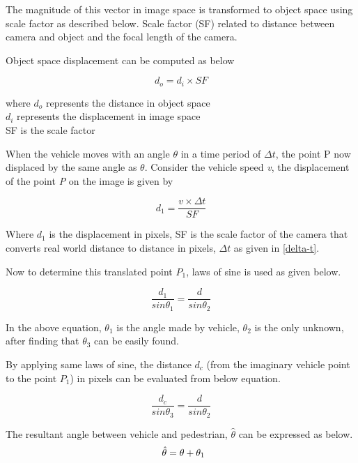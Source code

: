 The magnitude of this vector in image space is transformed to object space using scale factor as described below. Scale factor (SF) related to distance between camera and object and the focal length of the camera.

Object space displacement can be computed as below

\begin{equation} \label{conversion}
{d_o}= {d_i} \times SF
\end{equation} 

where $d_o$ represents the distance in object space \\
$d_i$ represents the displacement in image space \\
SF is the scale factor

When the vehicle moves with an angle ${\theta }$ in a time period of ${\Delta t}$, the point P now displaced by the same angle as ${\theta}$. Consider the vehicle speed \textit{v}, the displacement of the point \textit{P} on the image is given by

\begin{equation} \label{distance-in-pixel}
{d_1}= \frac{v \times \Delta t}{SF}
\end{equation} 

Where ${d_1}$ is the displacement in pixels, SF is the scale factor of the camera that converts real world distance to distance in pixels, $\Delta t$ as given in \ref{delta-t}.

Now to determine this translated point ${P_1}$, laws of sine is used as given below. 

\begin{equation}
\frac{d_1}{sin \theta_1} = \frac{d}{sin \theta_2} 
\end{equation}

In the above equation, $\theta_1$ is the angle made by vehicle, $\theta_2$ is the only unknown, after finding that $\theta_3$ can be easily found.

By applying same laws of sine, the distance $d_c$ (from the imaginary vehicle point to the point $P_1$) in pixels can be evaluated from below equation.

\begin{equation} \label{camera-distance}
\frac{d_c}{sin \theta_3} = \frac{d}{sin \theta_2} 
\end{equation} 


The resultant angle between vehicle and pedestrian, ${\hat{\theta}}$ can be expressed as below.
\begin{equation} \label{theta-large}
\begin{array}{l@{}}
\hat{\theta } = \theta  + {\theta}_1
\end{array}			
\end{equation} 

